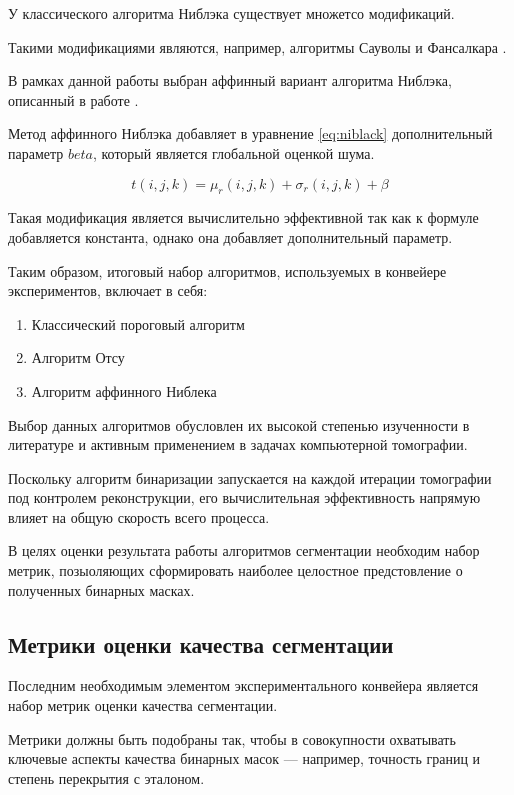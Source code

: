 У классического алгоритма Ниблэка существует множетсо модификаций.

Такими модификациями являются, например, алгоритмы Сауволы \cite{sauvola2000adaptive} и Фансалкара \cite{phansalkar2011adaptive}.

В рамках данной работы выбран аффинный вариант алгоритма Ниблэка, описанный в работе \cite{николаев2013критерии}.

Метод аффинного Ниблэка добавляет в уравнение \ref{eq:niblack} дополнительный параметр \(beta\), который является глобальной оценкой шума.

\begin{equation}\label{eq:niblack_affine}
    t(i, j, k) = \mu_r(i, j, k) + \sigma_r(i, j, k) + \beta
\end{equation}

Такая модификация является вычислительно эффективной так как к формуле добавляется константа, однако она добавляет дополнительный параметр. 

Таким образом, итоговый набор алгоритмов, используемых в конвейере экспериментов, включает в себя:

\begin{enumerate}
    \item Классический пороговый алгоритм
    \item Алгоритм Отсу
    \item Алгоритм аффинного Ниблека
\end{enumerate}

Выбор данных алгоритмов обусловлен их высокой степенью изученности в литературе и активным применением в задачах компьютерной томографии.

Поскольку алгоритм бинаризации запускается на каждой итерации томографии под контролем реконструкции, его вычислительная эффективность напрямую влияет на общую скорость всего процесса.

В целях оценки результата работы алгоритмов сегментации необходим набор метрик, позыоляющих сформировать наиболее целостное предстовление о полученных бинарных масках.

\subsection{Метрики оценки качества сегментации}

Последним необходимым элементом экспериментального конвейера является набор метрик оценки качества сегментации.

Метрики должны быть подобраны так, чтобы в совокупности охватывать ключевые аспекты качества бинарных масок — например, точность границ и степень перекрытия с эталоном. 

